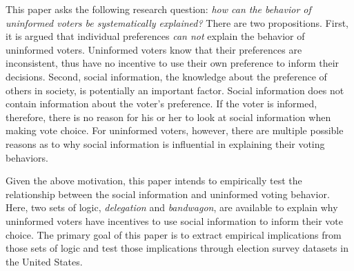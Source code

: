 \documentclass[doc,natbib,12pt]{apa6}\usepackage[]{graphicx}\usepackage[]{color}
\begin{document}
    \par This paper asks the following research question: \textit{how can the behavior of uninformed voters be systematically explained?} There are two propositions. First, it is argued that individual preferences \textit{can not} explain the behavior of uninformed voters. Uninformed voters know that their preferences are inconsistent, thus have no incentive to use their own preference to inform their decisions. Second, social information, the knowledge about the preference of others in society, is potentially an important factor. Social information does not contain information about the voter's preference. If the voter is informed, therefore, there is no reason for his or her to look at social information when making vote choice. For uninformed voters, however, there are multiple possible reasons as to why social information is influential in explaining their voting behaviors. 
    
    \par Given the above motivation, this paper intends to empirically test the relationship between the social information and uninformed voting behavior. Here, two sets of logic, \textit{delegation} and \textit{bandwagon}, are available to explain why uninformed voters have incentives to use social information to inform their vote choice. The primary goal of this paper is to extract empirical implications from those sets of logic and test those implications through election survey datasets in the United States.
    
    
\end{document}
